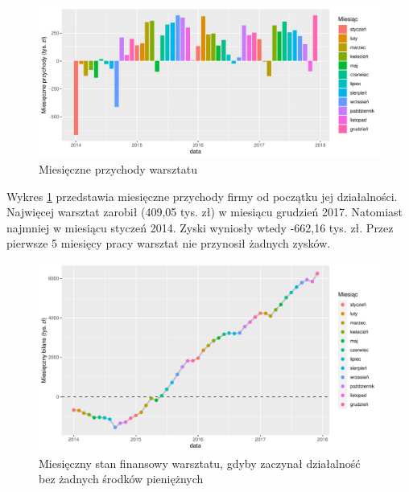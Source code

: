 \documentclass{article}\usepackage[]{graphicx}\usepackage[]{xcolor}
\makeatletter
\def\maxwidth{ %
  \ifdim\Gin@nat@width>\linewidth
    \linewidth
  \else
    \Gin@nat@width
  \fi
}
\newenvironment{knitrout}{}{} %
\makeatother
\begin{document}
\begin{knitrout}
\color{fgcolor}\begin{figure}[H]

{\centering \includegraphics[width=\maxwidth]{figure/fig_bilans-1} 

}

\caption[Miesięczne przychody warsztatu]{Miesięczne przychody warsztatu}\label{fig:fig_bilans}
\end{figure}

\end{knitrout}


Wykres \ref{fig:fig_bilans} przedstawia miesięczne przychody firmy od początku jej działalności. 
Najwięcej warsztat zarobił (409,05 tys. zł) w miesiącu grudzień 2017.
Natomiast najmniej w miesiącu styczeń 2014. Zyski wyniosły wtedy -662,16 tys. zł. Przez pierwsze 5 miesięcy pracy warsztat nie przynosił żadnych zysków.

\begin{knitrout}
\color{fgcolor}\begin{figure}[H]

{\centering \includegraphics[width=\maxwidth]{figure/fig_bilans_suma-1} 

}

\caption[Miesięczny stan finansowy warsztatu, gdyby zaczynał działalność bez żadnych środków pieniężnych]{Miesięczny stan finansowy warsztatu, gdyby zaczynał działalność bez żadnych środków pieniężnych}\label{fig:fig_bilans_suma}
\end{figure}

\end{knitrout}
\end{document}
